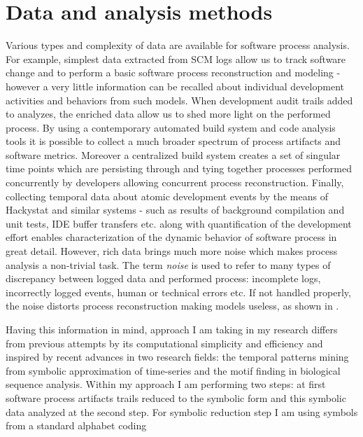 \documentclass{sig-alternate}
\begin{document}
\section{Data and analysis methods}
Various types and complexity of data are available for software process analysis. For example, simplest data extracted from SCM logs allow us to track software change and to perform a basic software process reconstruction and modeling - however a very little information can be recalled about individual development activities and behaviors from such models. When development audit trails added to analyzes, the enriched data allow us to shed more light on the performed process. By using a contemporary automated build system and code analysis tools it is possible to collect a much broader spectrum of process artifacts and software metrics. Moreover a centralized build system creates a set of singular time points which are persisting through and tying together processes performed concurrently by developers allowing concurrent process reconstruction. Finally, collecting temporal data about atomic development events by the means of Hackystat and similar systems - such as results of background compilation and unit tests, IDE buffer transfers etc. along with quantification of the development effort enables characterization of the dynamic behavior of software process in great detail. However, rich data brings much more noise which makes process analysis a non-trivial task. The term \textit{noise} is used to refer to many types of discrepancy between logged data and performed process: incomplete logs, incorrectly logged events, human or technical errors etc. If not handled properly, the noise distorts process reconstruction making models useless, as shown in \cite{citeulike:2678511}. 

Having this information in mind, approach I am taking in my research differs from previous attempts by its computational simplicity and efficiency and inspired by recent advances in two research fields: the temporal patterns mining from symbolic approximation of time-series and the motif finding in biological sequence analysis. Within my approach I am performing two steps: at first software process artifacts trails reduced to the symbolic form and this symbolic data analyzed at the second step. For symbolic reduction step I am using symbols from a standard alphabet coding 
\end{document}

